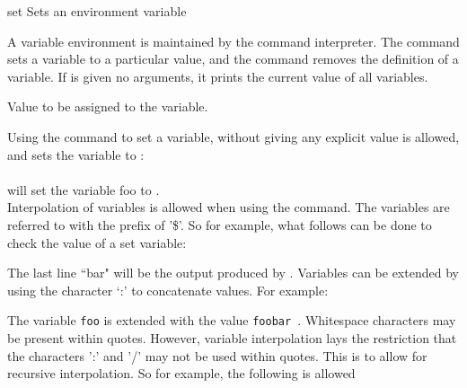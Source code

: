 \begin{nusmvCommand} {set} {Sets an environment variable}
 

A variable environment is maintained by the command interpreter.  The
 command sets a variable to a particular value, and the
 command removes the definition of a variable.  If
 is given no arguments, it prints the current value of
all variables.\\
\begin{cmdOpt}

 {Value to be assigned to the variable.}

\end{cmdOpt}

Using the  command to set a variable, without giving any
explicit value is allowed, and sets the variable to :\\
\\
will set the variable foo to .\\

Interpolation of variables is allowed when using the 
command. The variables are referred to with the prefix of '\$'. So for
example, what follows can be done to check the value of a set
variable:\\

The last line ``bar" will be the output produced by \nusmv.  Variables
can be extended by using the character `:' to concatenate values. For
example: \\

The variable  \texttt{foo} is extended with the value \texttt{foobar
}.  Whitespace characters may be present within quotes. However,
variable interpolation lays the restriction that the characters ':'
and '/' may not be used within quotes. This is to allow for recursive
interpolation.  So for example, the following is allowed\\


\end{nusmvCommand}
